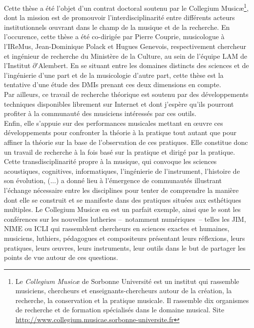 \noindent Cette thèse a été l'objet d'un contrat doctoral soutenu par le Collegium Musicæ\footnote{Le \textit{Collegium Musicæ} de Sorbonne Université est un institut qui rassemble musiciens, chercheurs et enseignants-chercheurs autour de la création, la recherche, la conservation et la pratique musicale. Il rassemble dix organismes de recherche et de formation spécialisés dans le domaine musical. Site \url{http://www.collegium.musicae.sorbonne-universite.fr}}, dont la mission est de promouvoir l'interdisciplinarité entre différents acteurs institutionnels œuvrant dans le champ de la musique et de la recherche. En l'occurence, cette thèse a été co-dirigée par Pierre Couprie, musicologue à l'\gls{IReMus}, Jean-Dominique Polack et Hugues Genevois, respectivement chercheur et ingénieur de recherche du Ministère de la Culture, au sein de l'équipe \gls{LAM} de l'Institut $\partial$'Alembert. En se situant entre les domaines distincts des sciences et de l'ingénierie d'une part et de la musicologie d'autre part, cette thèse est la tentative d'une étude des \glspl{DMI} prenant ces deux dimensions en compte.\\
\indent Par ailleurs, ce travail de recherche théorique est soutenu par des développements techniques disponibles librement sur Internet et dont j'espère qu'ils pourront profiter à la communauté des musiciens intéressés par ces outils.\\
\indent Enfin, elle s'appuie sur des performances musicales mettant en œuvre ces développements pour confronter la théorie à la pratique tout autant que pour affiner la théorie sur la base de l'observation de ces pratiques. Elle constitue donc un travail de recherche à la fois basé sur la pratique et dirigé par la pratique.\\
\indent Cette transdisciplinarité propre à la musique, qui convoque les sciences acoustiques, cognitives, informatiques, l'ingénierie de l'instrument, l'histoire de son évolution, (...) a donné lieu à l'émergence de communautés illustrant l'échange nécessaire entre les disciplines pour tenter de comprendre la manière dont elle se construit et se manifeste dans des pratiques situées aux esthétiques multiples. Le Collegium Musicæ en est un parfait exemple, ainsi que le sont les conférences sur les nouvelles lutheries --~notamment numériques~-- telles les \gls{JIM}, \gls{NIME} ou \gls{ICLI} qui rassemblent chercheurs en sciences exactes et humaines, musiciens, luthiers, pédagogues et compositeurs présentant leurs réflexions, leurs pratiques, leurs œuvres, leurs instruments, leur outils dans le but de partager les points de vue autour de ces questions.


